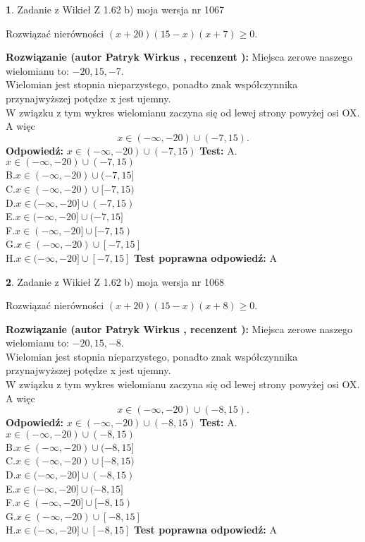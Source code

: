 \documentclass[12pt, a4paper]{article}
\theoremstyle{definition} %
\newtheorem{zad}{}
\newcommand{\zadStart}[1]{\begin{zad}#1\newline}
\newcommand{\zadStop}{\end{zad}}
\newcommand{\rozwStart}[2]{\noindent \textbf{Rozwiązanie (autor #1 , recenzent #2): }\newline}
\newcommand{\rozwStop}{\newline}
\newcommand{\odpStart}{\noindent \textbf{Odpowiedź:}\newline}
\newcommand{\odpStop}{\newline}
\newcommand{\testStart}{\noindent \textbf{Test:}\newline}
\newcommand{\testStop}{\newline}
\newcommand{\kluczStart}{\noindent \textbf{Test poprawna odpowiedź:}\newline}
\newcommand{\kluczStop}{\newline}
\begin{document}
\zadStart{Zadanie z Wikieł Z 1.62 b) moja wersja nr 1067}

Rozwiązać nierówności $(x+20)(15-x)(x+7)\ge0$.
\zadStop
\rozwStart{Patryk Wirkus}{}
Miejsca zerowe naszego wielomianu to: $-20, 15, -7$.\\
Wielomian jest stopnia nieparzystego, ponadto znak współczynnika przy\linebreak najwyższej potędze x jest ujemny.\\ W związku z tym wykres wielomianu zaczyna się od lewej strony powyżej osi OX. A więc $$x \in (-\infty,-20) \cup (-7,15).$$
\rozwStop
\odpStart
$x \in (-\infty,-20) \cup (-7,15)$
\odpStop
\testStart
A.$x \in (-\infty,-20) \cup (-7,15)$\\
B.$x \in (-\infty,-20) \cup (-7,15]$\\
C.$x \in (-\infty,-20) \cup [-7,15)$\\
D.$x \in (-\infty,-20] \cup (-7,15)$\\
E.$x \in (-\infty,-20] \cup (-7,15]$\\
F.$x \in (-\infty,-20] \cup [-7,15)$\\
G.$x \in (-\infty,-20) \cup [-7,15]$\\
H.$x \in (-\infty,-20] \cup [-7,15]$
\testStop
\kluczStart
A
\kluczStop



\zadStart{Zadanie z Wikieł Z 1.62 b) moja wersja nr 1068}

Rozwiązać nierówności $(x+20)(15-x)(x+8)\ge0$.
\zadStop
\rozwStart{Patryk Wirkus}{}
Miejsca zerowe naszego wielomianu to: $-20, 15, -8$.\\
Wielomian jest stopnia nieparzystego, ponadto znak współczynnika przy\linebreak najwyższej potędze x jest ujemny.\\ W związku z tym wykres wielomianu zaczyna się od lewej strony powyżej osi OX. A więc $$x \in (-\infty,-20) \cup (-8,15).$$
\rozwStop
\odpStart
$x \in (-\infty,-20) \cup (-8,15)$
\odpStop
\testStart
A.$x \in (-\infty,-20) \cup (-8,15)$\\
B.$x \in (-\infty,-20) \cup (-8,15]$\\
C.$x \in (-\infty,-20) \cup [-8,15)$\\
D.$x \in (-\infty,-20] \cup (-8,15)$\\
E.$x \in (-\infty,-20] \cup (-8,15]$\\
F.$x \in (-\infty,-20] \cup [-8,15)$\\
G.$x \in (-\infty,-20) \cup [-8,15]$\\
H.$x \in (-\infty,-20] \cup [-8,15]$
\testStop
\kluczStart
A
\kluczStop
\end{document}
